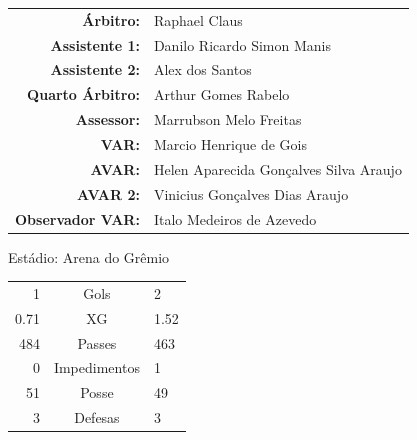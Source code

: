 \documentclass[11pt]{article}
\begin{document}
\vspace{0.5cm}
\begin{minipage}{0.65\textwidth}
\begin{center}
\begin{tabular}{rl}
\textbf{Árbitro:} & Raphael Claus \\
\textbf{Assistente 1:} & Danilo Ricardo Simon Manis \\
\textbf{Assistente 2:} & Alex dos Santos \\
\textbf{Quarto Árbitro:} & Arthur Gomes Rabelo \\
\textbf{Assessor:} & Marrubson Melo Freitas \\
\textbf{VAR:} & Marcio Henrique de Gois \\
\textbf{AVAR:} & Helen Aparecida Gonçalves Silva Araujo \\
\textbf{AVAR 2:} & Vinicius Gonçalves Dias Araujo \\
\textbf{Observador VAR:} & Italo Medeiros de Azevedo \\
\end{tabular}
\end{center}
\end{minipage}
\begin{minipage}{0.3\textwidth}
Estádio: Arena do Grêmio\\
\begin{tabular}{rcl}
1 & Gols & 2 \\
0.71 & XG & 1.52 \\
484 & Passes & 463 \\
0 & Impedimentos & 1 \\
51 & Posse & 49 \\
3 & Defesas & 3 \\
\end{tabular}
\end{minipage}
\newpage
\end{document}
